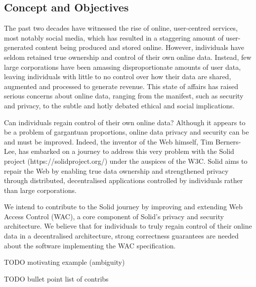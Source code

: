 \subsection{Concept and Objectives}

The past two decades have witnessed the rise of online, user-centred
services, most notably social media, which has resulted in a staggering
amount of user-generated content being produced and stored online.
However, individuals have seldom retained true ownership and control
of their own online data. Instead, few large corporations have been
amassing disproportionate amounts of user data, leaving individuals
with little to no control over how their data are shared, augmented
and processed to generate revenue. This state of affairs has raised
serious concerns about online data, ranging from the manifest, such
as security and privacy, to the subtle and hotly debated ethical and
social implications.\cite{stremlau2018world}

Can individuals regain control of their own online data? Although
it appears to be a problem of gargantuan proportions, online data
privacy and security can be and must be improved. Indeed, the inventor
of the Web himself, Tim Berners-Lee, has embarked on a journey to
address this very problem with the Solid project\cite{sambra2016solid}%
(https://solidproject.org/) under the auspices of the W3C. Solid aims
to repair the Web by enabling true data ownership and strengthened
privacy through distributed, decentralised applications controlled
by individuals rather than large corporations.

We intend to contribute to the Solid journey by improving and extending
Web Access Control (WAC), a core component of Solid's privacy and
security architecture. We believe that for individuals to truly regain
control of their online data in a decentralised architecture, strong
correctness guarantees are needed about the software implementing the
WAC specification.

TODO motivating example (ambiguity)

TODO bullet point list of contribs
